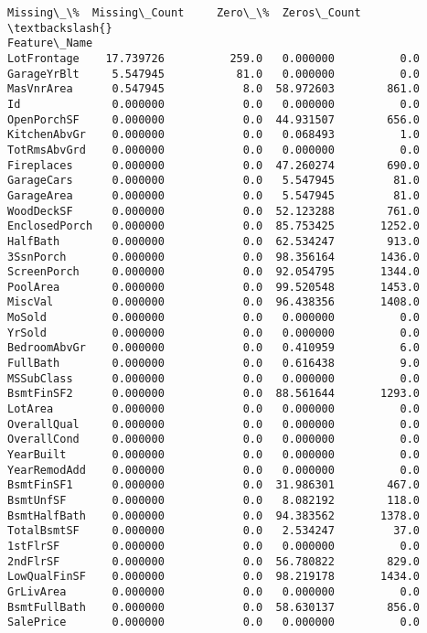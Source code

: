 \documentclass[11pt]{article}
\newcommand{\prompt}[4]{
        \llap{{\color{#2}[#3]: #4}}\vspace{-1.25em}
    }
\begin{document}
            \begin{tcolorbox}[breakable, boxrule=.5pt, size=fbox, pad at break*=1mm, opacityfill=0]
\prompt{Out}{outcolor}{5}{\hspace{3.5pt}}
\begin{Verbatim}[commandchars=\\\{\}]
               Missing\_\%  Missing\_Count     Zero\_\%  Zeros\_Count  \textbackslash{}
Feature\_Name
LotFrontage    17.739726          259.0   0.000000          0.0
GarageYrBlt     5.547945           81.0   0.000000          0.0
MasVnrArea      0.547945            8.0  58.972603        861.0
Id              0.000000            0.0   0.000000          0.0
OpenPorchSF     0.000000            0.0  44.931507        656.0
KitchenAbvGr    0.000000            0.0   0.068493          1.0
TotRmsAbvGrd    0.000000            0.0   0.000000          0.0
Fireplaces      0.000000            0.0  47.260274        690.0
GarageCars      0.000000            0.0   5.547945         81.0
GarageArea      0.000000            0.0   5.547945         81.0
WoodDeckSF      0.000000            0.0  52.123288        761.0
EnclosedPorch   0.000000            0.0  85.753425       1252.0
HalfBath        0.000000            0.0  62.534247        913.0
3SsnPorch       0.000000            0.0  98.356164       1436.0
ScreenPorch     0.000000            0.0  92.054795       1344.0
PoolArea        0.000000            0.0  99.520548       1453.0
MiscVal         0.000000            0.0  96.438356       1408.0
MoSold          0.000000            0.0   0.000000          0.0
YrSold          0.000000            0.0   0.000000          0.0
BedroomAbvGr    0.000000            0.0   0.410959          6.0
FullBath        0.000000            0.0   0.616438          9.0
MSSubClass      0.000000            0.0   0.000000          0.0
BsmtFinSF2      0.000000            0.0  88.561644       1293.0
LotArea         0.000000            0.0   0.000000          0.0
OverallQual     0.000000            0.0   0.000000          0.0
OverallCond     0.000000            0.0   0.000000          0.0
YearBuilt       0.000000            0.0   0.000000          0.0
YearRemodAdd    0.000000            0.0   0.000000          0.0
BsmtFinSF1      0.000000            0.0  31.986301        467.0
BsmtUnfSF       0.000000            0.0   8.082192        118.0
BsmtHalfBath    0.000000            0.0  94.383562       1378.0
TotalBsmtSF     0.000000            0.0   2.534247         37.0
1stFlrSF        0.000000            0.0   0.000000          0.0
2ndFlrSF        0.000000            0.0  56.780822        829.0
LowQualFinSF    0.000000            0.0  98.219178       1434.0
GrLivArea       0.000000            0.0   0.000000          0.0
BsmtFullBath    0.000000            0.0  58.630137        856.0
SalePrice       0.000000            0.0   0.000000          0.0


\end{Verbatim}
\end{tcolorbox}
\end{document}
